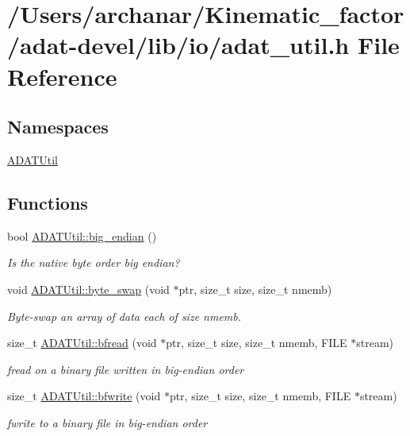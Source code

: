 \hypertarget{adat-devel_2lib_2io_2adat__util_8h}{}\section{/\+Users/archanar/\+Kinematic\+\_\+factor/adat-\/devel/lib/io/adat\+\_\+util.h File Reference}
\label{adat-devel_2lib_2io_2adat__util_8h}
\subsection*{Namespaces}
\begin{DoxyCompactItemize}
\item 
 \mbox{\hyperlink{namespaceADATUtil}{A\+D\+A\+T\+Util}}
\end{DoxyCompactItemize}
\subsection*{Functions}
\begin{DoxyCompactItemize}
\item 
bool \mbox{\hyperlink{namespaceADATUtil_a7f9f0561f3ffcb562067ebedbade089f}{A\+D\+A\+T\+Util\+::big\+\_\+endian}} ()
\begin{DoxyCompactList}\small\item\em Is the native byte order big endian? \end{DoxyCompactList}\item 
void \mbox{\hyperlink{namespaceADATUtil_af522573b90be52b1e09342dd11e23199}{A\+D\+A\+T\+Util\+::byte\+\_\+swap}} (void $\ast$ptr, size\+\_\+t size, size\+\_\+t nmemb)
\begin{DoxyCompactList}\small\item\em Byte-\/swap an array of data each of size nmemb. \end{DoxyCompactList}\item 
size\+\_\+t \mbox{\hyperlink{namespaceADATUtil_af41a672c512fa9828e3ada70420985c9}{A\+D\+A\+T\+Util\+::bfread}} (void $\ast$ptr, size\+\_\+t size, size\+\_\+t nmemb, F\+I\+LE $\ast$stream)
\begin{DoxyCompactList}\small\item\em fread on a binary file written in big-\/endian order \end{DoxyCompactList}\item 
size\+\_\+t \mbox{\hyperlink{namespaceADATUtil_afcbd366717135244eee5acb0d5ba86ac}{A\+D\+A\+T\+Util\+::bfwrite}} (void $\ast$ptr, size\+\_\+t size, size\+\_\+t nmemb, F\+I\+LE $\ast$stream)
\begin{DoxyCompactList}\small\item\em fwrite to a binary file in big-\/endian order \end{DoxyCompactList}\end{DoxyCompactItemize}
